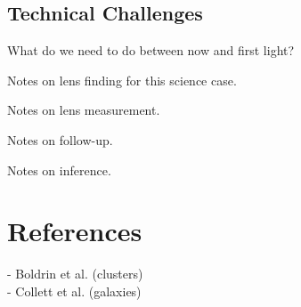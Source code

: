 \documentclass{article}
\begin{document}
\subsection{Technical Challenges}

What do we need to do between now and first light?

Notes on lens finding for this science case.

Notes on lens measurement.

Notes on follow-up.

Notes on inference.



\section{References}

- Boldrin et al. (clusters)\\

- Collett et al. (galaxies)\\
\end{document}
